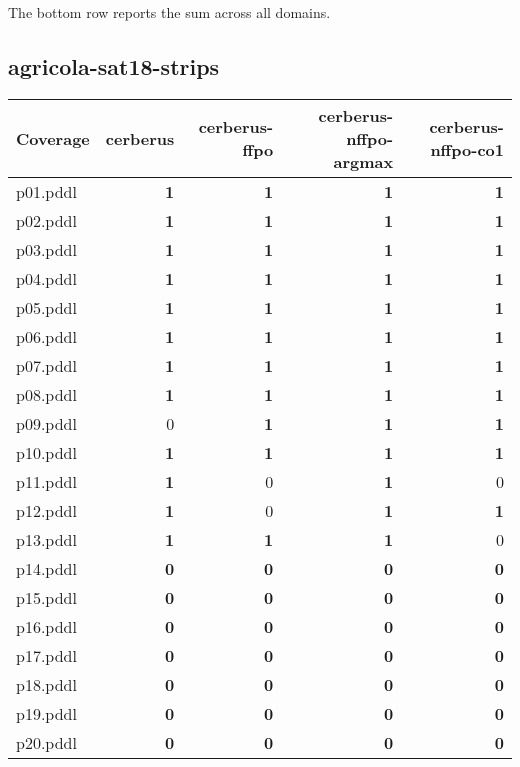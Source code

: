 \documentclass{article}
\begin{document}
The bottom row reports the sum across all domains.

\hypertarget{coverage-agricola-sat18-strips}{}
\subsection*{agricola-sat18-strips}

\begin{tabular}{@{}lrrrr@{}}
Coverage & cerberus & cerberus-ffpo & cerberus-nffpo-argmax & cerberus-nffpo-co1 \\
\midrule
p01.pddl & \textbf{1} & \textbf{1} & \textbf{1} & \textbf{1} \\
p02.pddl & \textbf{1} & \textbf{1} & \textbf{1} & \textbf{1} \\
p03.pddl & \textbf{1} & \textbf{1} & \textbf{1} & \textbf{1} \\
p04.pddl & \textbf{1} & \textbf{1} & \textbf{1} & \textbf{1} \\
p05.pddl & \textbf{1} & \textbf{1} & \textbf{1} & \textbf{1} \\
p06.pddl & \textbf{1} & \textbf{1} & \textbf{1} & \textbf{1} \\
p07.pddl & \textbf{1} & \textbf{1} & \textbf{1} & \textbf{1} \\
p08.pddl & \textbf{1} & \textbf{1} & \textbf{1} & \textbf{1} \\
p09.pddl & 0 & \textbf{1} & \textbf{1} & \textbf{1} \\
p10.pddl & \textbf{1} & \textbf{1} & \textbf{1} & \textbf{1} \\
p11.pddl & \textbf{1} & 0 & \textbf{1} & 0 \\
p12.pddl & \textbf{1} & 0 & \textbf{1} & \textbf{1} \\
p13.pddl & \textbf{1} & \textbf{1} & \textbf{1} & 0 \\
p14.pddl & \textbf{0} & \textbf{0} & \textbf{0} & \textbf{0} \\
p15.pddl & \textbf{0} & \textbf{0} & \textbf{0} & \textbf{0} \\
p16.pddl & \textbf{0} & \textbf{0} & \textbf{0} & \textbf{0} \\
p17.pddl & \textbf{0} & \textbf{0} & \textbf{0} & \textbf{0} \\
p18.pddl & \textbf{0} & \textbf{0} & \textbf{0} & \textbf{0} \\
p19.pddl & \textbf{0} & \textbf{0} & \textbf{0} & \textbf{0} \\
p20.pddl & \textbf{0} & \textbf{0} & \textbf{0} & \textbf{0} \\
\end{tabular}
\end{document}
